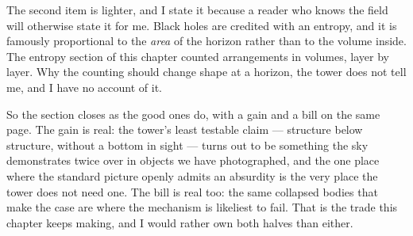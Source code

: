 The second item is lighter, and I state it because a reader who knows the field will otherwise state it for me. Black holes are credited with an entropy, and it is famously proportional to the \emph{area} of the horizon rather than to the volume inside. The entropy section of this chapter counted arrangements in volumes, layer by layer. Why the counting should change shape at a horizon, the tower does not tell me, and I have no account of it.

So the section closes as the good ones do, with a gain and a bill on the same page. The gain is real: the tower's least testable claim --- structure below structure, without a bottom in sight --- turns out to be something the sky demonstrates twice over in objects we have photographed, and the one place where the standard picture openly admits an absurdity is the very place the tower does not need one. The bill is real too: the same collapsed bodies that make the case are where the mechanism is likeliest to fail. That is the trade this chapter keeps making, and I would rather own both halves than either.

